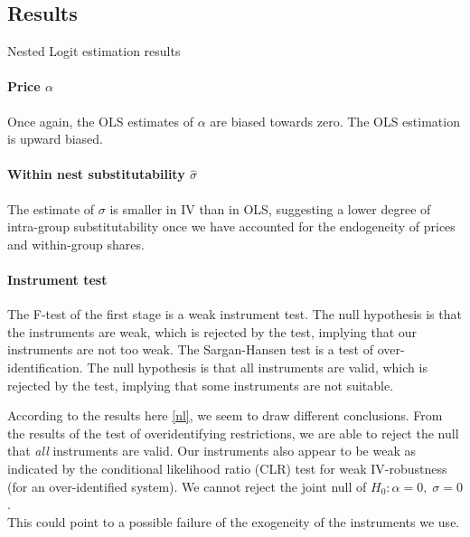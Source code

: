 \documentclass[12pt]{article}[margin=1in]
\begin{document}
\subsection{Results}

\begin{table}[h!]
    \fontsize{8pt}{10pt}\selectfont
    \centering
    
    \caption{Nested Logit estimation results}
    \label{tab:reg_nested_logit}
\end{table}

\paragraph{Price $\alpha$} Once again, the OLS estimates of $\alpha$ are biased towards zero. The OLS
estimation is upward biased.

\paragraph{Within nest substitutability $\hat{\sigma}$} The estimate of $\sigma$ is smaller in IV than in OLS, suggesting a lower degree of intra-group substitutability once we have accounted for the endogeneity of prices and within-group shares.

\paragraph{Instrument test}
The F-test of the first stage is a weak instrument test. The null hypothesis is
that the instruments are weak, which is rejected by the test, implying that our
instruments are not too weak. The Sargan-Hansen test is a test of
over-identification. The null hypothesis is that all instruments are valid,
which is rejected by the test, implying that some instruments are not suitable.


According to the results here \ref{nl}, we seem to draw different conclusions.
From the results of the test of overidentifying restrictions, we are able to
reject the null that \textit{all} instruments are valid. Our instruments also
appear to be weak as indicated by the conditional likelihood ratio (CLR) test
for weak IV-robustness (for an over-identified system). We cannot reject the
joint null of $H_0: \alpha=0, \; \sigma=0$. \\ This could point to a possible
failure of the exogeneity of the instruments we use.
\end{document}
